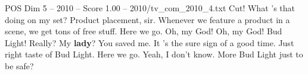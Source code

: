 \begin{textsample}{POS Dim 5 – 2010 – Score 1.00 – 2010/tv\_com\_2010\_4.txt}  \label{ex:f5_pos_073}
Cut!
What 's that doing on my set?
Product placement, sir.
Whenever we feature a product in a scene, we get tons of free stuff.
Here we go.
Oh, my God!
Oh, my God!
Bud Light!
Really?
My \textbf{lady}?
You saved me.
It 's the sure sign of a good time.
Just right taste of Bud Light.
Here we go.
Yeah, I don't know.
More Bud Light just to be safe?

\end{textsample}
